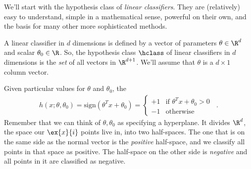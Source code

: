 We'll start with the hypothesis class of {\em linear classifiers}.
They are (relatively) easy to understand, simple in a mathematical
sense, powerful on their own, and the basis for many other more
sophisticated methods.

A linear classifier in $d$ dimensions is
defined by a vector of parameters $\theta \in \R^d$ and scalar
$\theta_0 \in \R$.  So, the hypothesis class $\hclass$ of linear
classifiers in $d$ dimensions is the {\em set} of all vectors in
$\R^{d+1}$.   We'll assume that $\theta$ is a $d \times 1$ column
vector.

Given particular values for $\theta$ and $\theta_0$, the  
\begin{eqnarray*}
  h(x; \theta, \theta_0) = \text{sign}(\theta^T x + \theta_0)
  = \begin{cases} +1 & \text{if $\theta^Tx + \theta_0 > 0$} \\ -1 &
              \text{otherwise}\end{cases} \;\;.
\end{eqnarray*}
Remember that we can think of $\theta, \theta_0$ as specifying a
hyperplane.  It divides $\R^d$, the space our $\ex{x}{i}$ points live
in, into two half-spaces.  The one that is on the same side as the
normal vector is the {\em positive} half-space, and we classify all
points in that space as positive.  The half-space on the other side is
  {\em negative} and all points in it are classified as negative.

